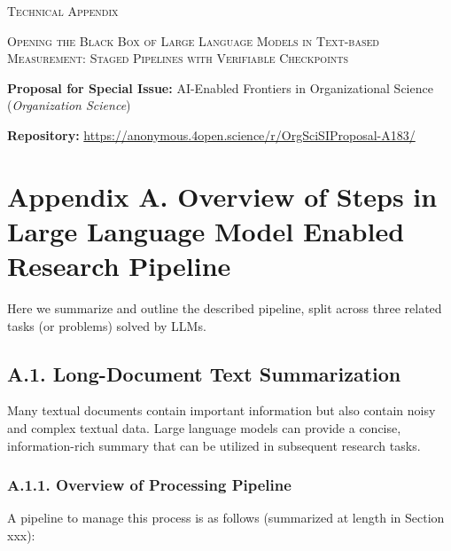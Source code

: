 \documentclass[11pt]{article}
\begin{document}
\begin{center}
    {\huge \textsc{Technical Appendix}\par}
    \vspace{1.2em}
    {\Large \textsc{Opening the Black Box of Large Language Models in Text-based Measurement: Staged Pipelines with Verifiable Checkpoints}\par}
    \vspace{1em}
    {\footnotesize\textbf{Proposal for Special Issue:} AI-Enabled Frontiers in Organizational Science (\textit{Organization Science})\par}
    \vspace{0.3em}
    {\footnotesize\textbf{Repository:} \url{https://anonymous.4open.science/r/OrgSciSIProposal-A183/}\par}
\end{center}

\vspace{1.5em}

\section*{Appendix A. Overview of Steps in Large Language Model Enabled Research Pipeline}

Here we summarize and outline the described pipeline, split across three related tasks (or problems) solved by LLMs.

\subsection*{A.1. Long-Document Text Summarization}

Many textual documents contain important information but also contain noisy and complex textual data. Large language models can provide a concise, information-rich summary that can be utilized in subsequent research tasks.

\subsubsection*{A.1.1. Overview of Processing Pipeline}

A pipeline to manage this process is as follows (summarized at length in Section xxx):
\end{document}
